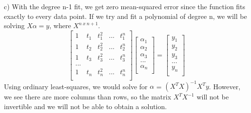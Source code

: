 \documentclass[11pt]{article}
\newenvironment{problem}[2][Problem]{\begin{trivlist}
\item[\hskip \labelsep {\bfseries #1}\hskip \labelsep {\bfseries #2.}]}{\end{trivlist}}
\begin{document}
\begin{problem}{2.1}
(c) 
With the degree n-1 fit, we get zero mean-squared error since the function fits exactly to every data point. If we try and fit a polynomial of degree n, we will be solving $X\alpha = y$, where $X^{n~x~n+1}$.
\[
	\begin{bmatrix}
	1 & t_{1} & t^2_{1} & ... & t^n_{1}\\
	1 & t_{2} & t^2_{2} & ... & t^n_{2}\\
	1 & t_{3} & t^2_{3} & ... & t^n_{3}\\
	...\\
	1 & t_{n} & t^2_{n} & ... & t^n_{n}\\
	\end{bmatrix}
	\begin{bmatrix}
		\alpha_{1}\\
		\alpha_{2}\\
		\alpha_{3}\\
		...\\
		\alpha_{n}\\
	 \end{bmatrix}
=
	\begin{bmatrix}
		y_{1}\\
		y_{2}\\
		y_{3}\\
		...\\
		y_{n}\\
	 \end{bmatrix}
\]
Using ordinary least-squares, we would solve for $\alpha$ = $(X^{T}X)^{-1}X^{T}y$. However, we see there are more columns than rows, so the matrix $X^{T}X^{-1}$ will not be invertible and we will not be able to obtain a solution. 


\end{problem}
\end{document}
